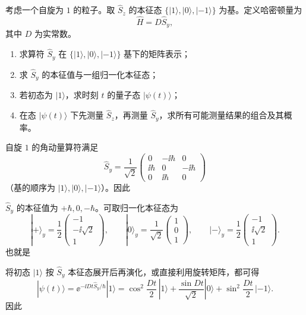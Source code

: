 \begin{question}
考虑一个自旋为 $1$ 的粒子。取 $\hat S_z$ 的本征态 $\{|1\rangle,|0\rangle,|-1\rangle\}$ 为基。定义哈密顿量为
\[
\hat H=D\hat S_y,
\]
其中 $D$ 为实常数。

\begin{enumerate}[label=(\arabic*),leftmargin=2.5em]
  \item 求算符 $\hat S_y$ 在 $\{|1\rangle,|0\rangle,|-1\rangle\}$ 基下的矩阵表示；
  \item 求 $\hat S_y$ 的本征值与一组归一化本征态；
  \item 若初态为 $|1\rangle$，求时刻 $t$ 的量子态 $|\psi(t)\rangle$；
  \item 在态 $|\psi(t)\rangle$ 下先测量 $\hat S_z$，再测量 $\hat S_y$，求所有可能测量结果的组合及其概率。
\end{enumerate}

\begin{solution}
自旋 $1$ 的角动量算符满足
\[
\hat S_y=\frac{1}{\sqrt2}
\begin{pmatrix}
0&-\ii\hbar&0\\
\ii\hbar&0&-\ii\hbar\\
0&\ii\hbar&0
\end{pmatrix}
\]
（基的顺序为 $|1\rangle,|0\rangle,|-1\rangle$）。因此

$\hat S_y$ 的本征值为 $+\hbar,0,-\hbar$。可取归一化本征态为
\[
|+\rangle_y=\frac{1}{2}
\begin{pmatrix}-1\\-\ii\sqrt2\\1\end{pmatrix},
\qquad
|0\rangle_y=\frac{1}{\sqrt2}
\begin{pmatrix}1\\0\\1\end{pmatrix},
\qquad
|-\rangle_y=\frac{1}{2}
\begin{pmatrix}-1\\\ii\sqrt2\\1\end{pmatrix}.
\]
也就是

将初态 $|1\rangle$ 按 $\hat S_y$ 本征态展开后再演化，或直接利用旋转矩阵，都可得
\[
|\psi(t)\rangle=\ee^{-\ii Dt\hat S_y/\hbar}|1\rangle
=\cos^2\frac{Dt}{2}\,|1\rangle+\frac{\sin Dt}{\sqrt2}|0\rangle+\sin^2\frac{Dt}{2}\,|-1\rangle.
\]
因此


\end{solution}
\end{question}

